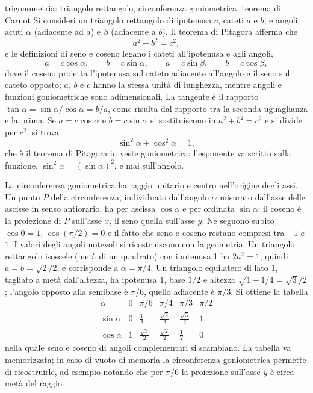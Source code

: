 \documentclass[main.tex]{subfiles}
\begin{document}
\renewcommand{\richiamoprefix}{Richiamo di Matematica --- }
\begin{riquadro}{trigonometria: triangolo rettangolo, circonferenza goniometrica, teorema di Carnot}
Si consideri un triangolo rettangolo di ipotenusa $c$, cateti $a$ e $b$, e angoli acuti $\alpha$ (adiacente ad $a$) e $\beta$ (adiacente a $b$). Il teorema di Pitagora afferma che
\[
a^2+b^2=c^2 ,
\]
e le definizioni di seno e coseno legano i cateti all'ipotenusa e agli angoli,
\[
a=c\cos\alpha,\qquad b=c\sin\alpha,\qquad a=c\sin\beta,\qquad b=c\cos\beta ,
\]
dove il coseno proietta l'ipotenusa sul cateto adiacente all'angolo e il seno sul cateto opposto; $a$, $b$ e $c$ hanno la stessa unità di lunghezza, mentre angoli e funzioni goniometriche sono adimensionali. La tangente è il rapporto $\tan\alpha=\sin\alpha/\cos\alpha=b/a$, come risulta dal rapporto tra la seconda uguaglianza e la prima. Se $a=c\cos\alpha$ e $b=c\sin\alpha$ si sostituiscono in $a^2+b^2=c^2$ e si divide per $c^2$, si trova
\[
\sin^2\alpha+\cos^2\alpha=1 ,
\]
che è il teorema di Pitagora in veste goniometrica; l'esponente va scritto sulla funzione, $\sin^2\alpha=(\sin\alpha)^2$, e mai sull'angolo.

La circonferenza goniometrica ha raggio unitario e centro nell'origine degli assi. Un punto $P$ della circonferenza, individuato dall'angolo $\alpha$ misurato dall'asse delle ascisse in senso antiorario, ha per ascissa $\cos\alpha$ e per ordinata $\sin\alpha$: il coseno è la proiezione di $P$ sull'asse $x$, il seno quella sull'asse $y$. Ne seguono subito $\cos0=1$, $\cos(\pi/2)=0$ e il fatto che seno e coseno restano compresi tra $-1$ e $1$. I valori degli angoli notevoli si ricostruiscono con la geometria. Un triangolo rettangolo isoscele (metà di un quadrato) con ipotenusa 1 ha $2a^2=1$, quindi $a=b=\sqrt2/2$, e corrisponde a $\alpha=\pi/4$. Un triangolo equilatero di lato 1, tagliato a metà dall'altezza, ha ipotenusa 1, base $1/2$ e altezza $\sqrt{1-1/4}=\sqrt3/2$; l'angolo opposto alla semibase è $\pi/6$, quello adiacente è $\pi/3$. Si ottiene la tabella
\[
\begin{array}{c|ccccc}
\alpha & 0 & \pi/6 & \pi/4 & \pi/3 & \pi/2\\ \hline
\sin\alpha & 0 & \tfrac12 & \tfrac{\sqrt2}{2} & \tfrac{\sqrt3}{2} & 1\\[4pt]
\cos\alpha & 1 & \tfrac{\sqrt3}{2} & \tfrac{\sqrt2}{2} & \tfrac12 & 0
\end{array}
\]
nella quale seno e coseno di angoli complementari si scambiano. La tabella va memorizzata; in caso di vuoto di memoria la circonferenza goniometrica permette di ricostruirle, ad esempio notando che per $\pi/6$ la proiezione sull'asse $y$ è circa metà del raggio.


\end{riquadro}
\end{document}
